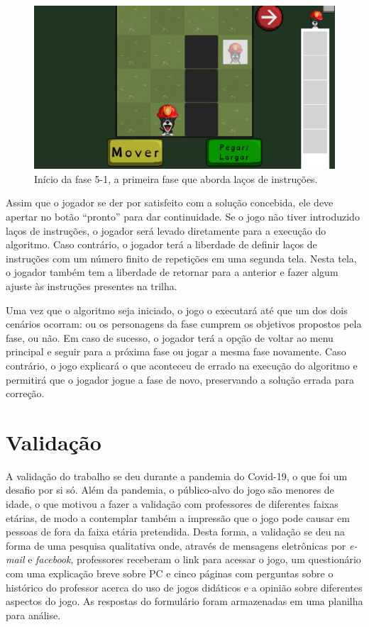 \documentclass[conference]{IEEEtran}
\begin{document}
\begin{figure}[htbp]
\centerline{\includegraphics[scale=0.275]{images/fig01.jpg}}
\caption{Início da fase 5-1, a primeira fase que aborda laços de instruções.}
\label{fig}
\end{figure}

Assim que o jogador se der por satisfeito com a solução concebida, ele deve apertar no botão ``pronto'' para dar continuidade. Se o jogo não tiver introduzido laços de instruções, o jogador será levado diretamente para a execução do algoritmo. Caso contrário, o jogador terá a liberdade de definir laços de instruções com um número finito de repetições em uma segunda tela. Nesta tela, o jogador também tem a liberdade de retornar para a anterior e fazer algum ajuste às instruções presentes na trilha.

Uma vez que o algoritmo seja iniciado, o jogo o executará até que um dos dois cenários ocorram: ou os personagens da fase cumprem os objetivos propostos pela fase, ou não. Em caso de sucesso, o jogador terá a opção de voltar ao menu principal e seguir para a próxima fase ou jogar a mesma fase novamente. Caso contrário, o jogo explicará o que aconteceu de errado na execução do algoritmo e permitirá que o jogador jogue a fase de novo, preservando a solução errada para correção.

\section{Validação}

A validação do trabalho se deu durante a pandemia do Covid-19, o que foi um desafio por si só. Além da pandemia, o público-alvo do jogo são menores de idade, o que motivou a fazer a validação com professores de diferentes faixas etárias, de modo a contemplar também a impressão que o jogo pode causar em pessoas de fora da faixa etária pretendida. Desta forma, a validação se deu na forma de uma pesquisa qualitativa onde, através de mensagens eletrônicas por \textit{e-mail} e \textit{facebook}, professores receberam o link para acessar o jogo, um questionário com uma explicação breve sobre PC e cinco páginas com perguntas sobre o histórico do professor acerca do uso de jogos didáticos e a opinião sobre diferentes aspectos do jogo. As respostas do formulário foram armazenadas em uma planilha para análise.
\end{document}
